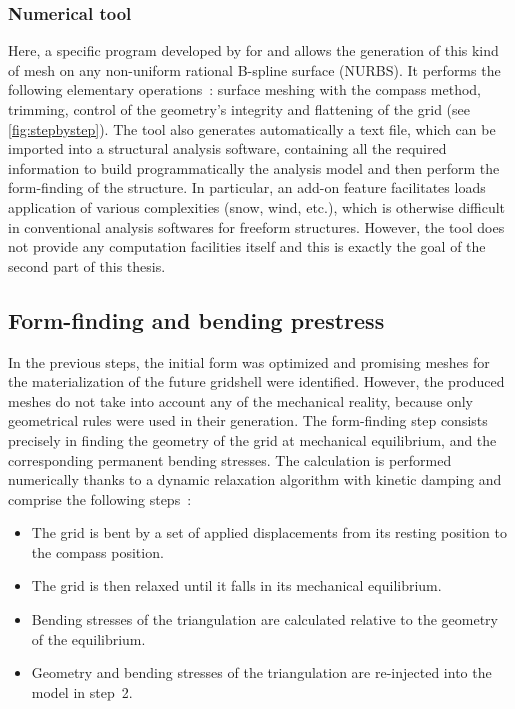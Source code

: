 \subsubsection{Numerical tool}
Here, a specific program developed by \citet{DuPeloux2011} for \rhino{} and \grasshopper{} allows the generation of this kind of mesh on any non-uniform rational B-spline surface (NURBS). It performs the following elementary operations~: surface meshing with the compass method, trimming, control of the geometry’s integrity and flattening of the grid (see \cref{fig:stepbystep}). The tool also generates automatically a text file, which can be imported into a structural analysis software, containing all the required information to build programmatically the analysis model and then perform the form-finding of the structure. In particular, an add-on feature facilitates loads application of various complexities (snow, wind, etc.), which is otherwise difficult in conventional analysis softwares for freeform structures. However, the tool does not provide any computation facilities itself and this is exactly the goal of the second part of this thesis.

\subsection{Form-finding and bending prestress}\label{sec=form-finding}
In the previous steps, the initial form was optimized and promising meshes for the materialization of the future gridshell were identified. However, the produced meshes do not take into account any of the mechanical reality, because only geometrical rules were used in their generation. The form-finding step consists precisely in finding the geometry of the grid at mechanical equilibrium, and the corresponding permanent bending stresses. The calculation is performed numerically thanks to a dynamic relaxation algorithm with kinetic damping and comprise the following steps~:
\begin{itemize}
\item The grid is bent by a set of applied displacements from its resting position to the compass position.
\item The grid is then relaxed until it falls in its mechanical equilibrium.
\item Bending stresses of the triangulation are calculated relative to the geometry of the equilibrium.
\item Geometry and bending stresses of the triangulation are re-injected into the model in step~2.
\end{itemize}

